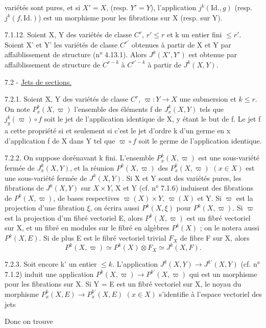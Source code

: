 variétés sont pures, et si $X'=X$, (resp. $Y'=Y$), l'application $j^k(\mathrm{Id}.,g)$ (resp. $j^k(f,\mathrm{Id}.)$) est un morphisme pour les fibrations sur X (resp. sur Y).

7.1.12. Soient X, Y des variétés de classe $C^r$, $r'\leq r$ et k un entier fini $\leq r'$. Soient X' et Y' les variétés de classe $C^{r'}$ obtenues à partir de X et Y par affaiblissement de structure (n° 4.13.1). Alors $J^k(X',Y')$ est obtenue par affaiblissement de structure de $C^{r-k}$ à $C^{r'-k}$ à partir de $J^k(X,Y)$.

7.2 - \uline{Jets de sections.}

7.2.1. Soient X, Y des variétés de classe $C^r$, $\varpi:Y\longrightarrow X$ une submersion et $k\leq r$. On note $P_x^k(X,\varpi)$ l'ensemble des éléments f de $J_x^k(X,Y)$ tels que $j_y^k(\varpi)\circ f$ soit le jet de l'application identique de X, y étant le but de f. Le jet f a cette propriété si et seulement si c'est le jet d'ordre k d'un germe en x d'application f de X dans Y tel que $\varpi\circ f$ soit le germe de l'application identique.

7.2.2. On suppose dorénavant k fini. L'ensemble $P_x^k(X,\varpi)$ est une sous-variété fermée de $J_x^k(X,Y)$, et la réunion $P^k(X,\varpi)$ des $P_x^k(X,\varpi)$ $(x\in X)$ est une sous-variété fermée de $J^k(X,Y)$. Si X et Y sont des variétés pures, les fibrations de $J^k(X,Y)$ sur $X\times Y$, X et Y (cf. n° 7.1.6) induisent des fibrations de $P^k(X,\varpi)$, de bases respectives $\varpi(X)\times Y$, $\varpi(X)$ et Y. Si $\varpi$ est la projection d'une fibration $\xi$, on écrira aussi $P^k(X,\xi)$ pour $P^k(X,\varpi)$. Si $\varpi$ est la projection d'un fibré vectoriel E, alors $P^k(X,\varpi)$ est un fibré vectoriel sur X, et un fibré en modules sur le fibré en algèbres $P^k(X)$ ; on le notera aussi $P^k(X,E)$. Si de plus E est le fibré vectoriel trivial $F_X$ de fibre F sur X, alors
\[
P^k(X,\varpi)\simeq P^k(X)\otimes F_X\simeq J^k(X,F).
\]

7.2.3. Soit encore k' un entier $\leq k$. L'application $J^k(X,Y)\longrightarrow J^{k'}(X,Y)$ (cf. n° 7.1.2) induit une application $P^k(X,\varpi)\longrightarrow P^{k'}(X,\varpi)$ qui est un morphisme pour les fibrations sur X. Si Y = E est un fibré vectoriel sur X, le noyau du morphisme $P_x^k(X,E)\longrightarrow P_x^{k'}(X,E)$ $(x\in X)$ s'identifie à l'espace vectoriel des jets

Donc  on trouve

